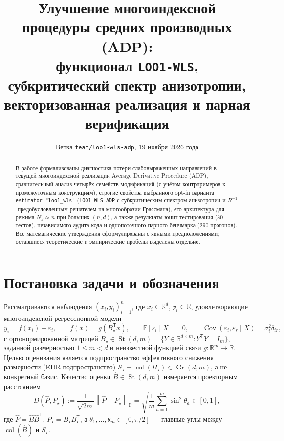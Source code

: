 \documentclass[11pt,a4paper]{article}
\title{Улучшение многоиндексной процедуры средних производных (ADP):\\
\large функционал \texttt{LOO1-WLS}, субкритический спектр анизотропии,\\
векторизованная реализация и парная верификация}
\author{}
\date{Ветка \texttt{feat/loo1-wls-adp}, 19 ноября 2026 года}
\numberwithin{equation}{section}
\theoremstyle{definition}
\theoremstyle{remark}
\newcommand{\R}{\mathbb{R}}
\newcommand{\E}{\mathbb{E}}
\newcommand{\Cov}{\operatorname{Cov}}
\newcommand{\col}{\operatorname{col}}
\newcommand{\Gr}{\operatorname{Gr}}
\newcommand{\St}{\operatorname{St}}
\newcommand{\T}{^{\mathsf T}}
\newcommand{\F}{_{\mathrm{F}}}
\newcommand{\norm}[1]{\left\lVert #1 \right\rVert}
\newcommand{\code}[1]{\nolinkurl{#1}}
\begin{document}
\maketitle

\begin{abstract}
В работе формализованы диагностика потери слабовыраженных направлений в текущей
многоиндексной реализации Average Derivative Procedure (ADP), сравнительный
анализ четырёх семейств модификаций (с учётом контрпримеров к промежуточным
конструкциям), строгие свойства выбранного opt-in варианта \code{estimator="loo1_wls"}
(\texttt{LOO1-WLS-ADP} с субкритическим спектром анизотропии и $R^{-1}$-предобусловленным
решателем на многообразии Грассмана), его архитектура для режима $N_J \approx n$
при больших $(n,d)$, а также результаты юнит-тестирования (80 тестов),
независимого аудита кода и однопоточного парного бенчмарка (290 прогонов).
Все математические утверждения сформулированы с явными предположениями;
оставшиеся теоретические и эмпирические пробелы выделены отдельно.
\end{abstract}

\tableofcontents
\newpage

\section{Постановка задачи и обозначения}
\label{sec:setup}

Рассматриваются наблюдения $(x_i, y_i)_{i=1}^n$, где $x_i \in \R^d$, $y_i \in \R$,
удовлетворяющие многоиндексной регрессионной модели
\begin{equation}\label{eq:model}
  y_i = f(x_i) + \varepsilon_i, \qquad
  f(x) = g(B_\star\T x), \qquad
  \E[\varepsilon_i \mid X] = 0, \qquad
  \Cov(\varepsilon_i, \varepsilon_r \mid X) = \sigma_i^2 \delta_{ir},
\end{equation}
с ортонормированной матрицей $B_\star \in \St(d,m) = \{Y \in \R^{d \times m} : Y\T Y = I_m\}$,
заданной размерностью $1 \le m < d$ и неизвестной функцией связи $g : \R^m \to \R$.
Целью оценивания является подпространство эффективного снижения размерности
(EDR-подпространство) $S_\star = \col(B_\star) \in \Gr(d,m)$, а не конкретный базис.
Качество оценки $\widehat{B} \in \St(d,m)$ измеряется проекторным расстоянием
\begin{equation}\label{eq:edr-metric}
  D(\widehat{P}, P_\star)
  := \frac{1}{\sqrt{2m}} \norm{\widehat{P} - P_\star}\F
  = \sqrt{\frac{1}{m}\sum_{a=1}^m \sin^2 \theta_a} \in [0, 1],
\end{equation}
где $\widehat{P} = \widehat{B}\widehat{B}\T$, $P_\star = B_\star B_\star\T$,
а $\theta_1, \dots, \theta_m \in [0, \pi/2]$ — главные углы между $\col(\widehat{B})$ и $S_\star$.
\end{document}
